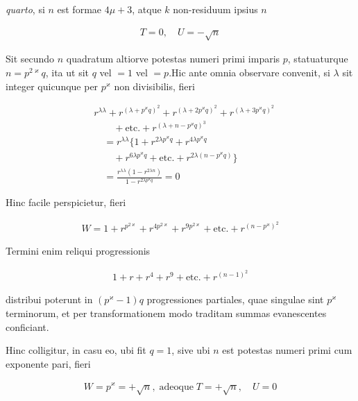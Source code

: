 \emph{quarto}, si $n$ est formae $4\mu+3$, atque $k$ non-residuum ipsius $n$

\[
\begin{aligned}
T=0,\quad U=-\surd n
\end{aligned}
\]


Sit secundo $n$ quadratum altiorve potestas numeri primi imparis $p$, statuaturque $n=p^{2\varkappa}q$, ita ut sit $q$ vel $=1$ vel $=p$.\quad Hic ante omnia observare convenit, si $\lambda$ sit integer quicunque per $p^\varkappa$ non divisibilis, fieri

%
\[
\begin{aligned}
&r^{\lambda\lambda}+r^{(\lambda+p^\varkappa q)^2}+r^{(\lambda+2p^\varkappa q)^2}+r^{(\lambda+3p^\varkappa q)^2}\\&\qquad+\text{etc.}+r^{(\lambda+n-p^\varkappa q)^{3}}\\
&\quad=r^{\lambda\lambda}\{1+r^{2\lambda p^\varkappa q}+r^{4\lambda p^\varkappa q}\\&\qquad+r^{6\lambda p^\varkappa q}+\text{etc.}+r^{2\lambda(n-p^\varkappa q)}\}\\&\quad=\frac{r^{\lambda\lambda}(1-r^{2\lambda n})}{1-r^{2\lambda p^\varkappa q}}=0
\end{aligned}
\]

Hinc facile perspicietur, fieri

\[
\begin{aligned}
W=1+r^{p^{2\varkappa}}+r^{4p^{2\varkappa}}+r^{9p^{2\varkappa}}+\text{etc.}+r^{(n-p^\varkappa)^2}
\end{aligned}
\]

Termini enim reliqui progressionis

\[
\begin{aligned}
1+r+r^4+r^9+\text{etc.}+r^{(n-1)^2}
\end{aligned}
\]

distribui poterunt in $(p^\varkappa-1)q$ progressiones partiales, quae singulae sint $p^\varkappa$ terminorum, et per transformationem modo traditam summas evanescentes conficiant.

Hinc colligitur, in casu eo, ubi fit $q=1$, sive ubi $n$ est potestas numeri primi cum exponente pari, fieri

\[
\begin{aligned}
W=p^\varkappa=+\surd n,\;\text{adeoque}\;T=+\surd n,\quad U=0
\end{aligned}
\]

